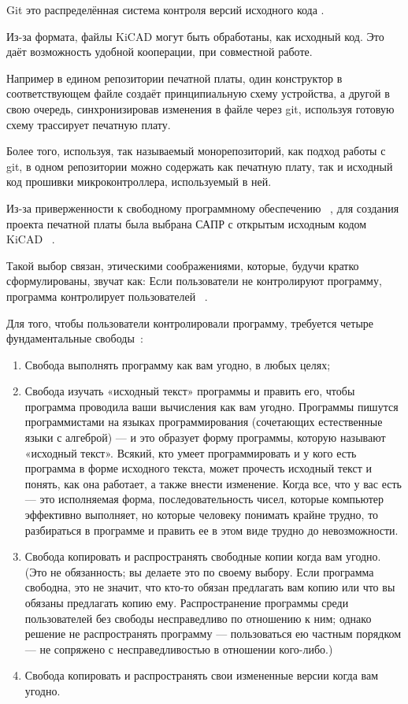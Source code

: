 Git это распределённая система контроля версий 
исходного кода \cite{git-dvcs}.

Из-за формата, файлы KiCAD могут быть обработаны, как
исходный код.
Это даёт возможность удобной кооперации, при совместной работе.

Например в едином репозитории печатной платы, один конструктор в
соответствующем файле создаёт принципиальную схему устройства, а
другой в свою очередь, синхронизировав изменения в файле через
git, используя готовую схему трассирует печатную плату.

Более того, используя, так называемый монорепозиторий, как подход
работы с git, в одном репозитории можно содержать как
печатную плату, так и исходный код прошивки микроконтроллера,
используемый в ней.

Из-за приверженности к свободному программному обеспечению
~\cite{GNU-philosophy}, для создания проекта печатной платы была
выбрана САПР с открытым исходным кодом KiCAD
~\cite{kicad-license}.

Такой выбор связан, этическими соображениями, которые, будучи
кратко сформулированы, звучат как:
Если пользователи не контролируют программу,
программа контролирует пользователей ~\cite{unfair-nonfree-programms}.

Для того, чтобы пользователи контролировали программу, требуется
четыре фундаментальные свободы~\cite{unfair-nonfree-programms}:

\begin{enumerate}
\item Свобода выполнять программу как вам угодно, в любых целях;
  
\item Свобода изучать «исходный текст» программы и править его, чтобы
программа проводила ваши вычисления как вам угодно. Программы пишутся
программистами на языках программирования (сочетающих естественные
языки с алгеброй) — и это образует форму программы, которую называют
«исходный текст». Всякий, кто умеет программировать и у кого есть
программа в форме исходного текста, может прочесть исходный текст и
понять, как она работает, а также внести изменение. Когда все, что у
вас есть — это исполняемая форма, последовательность чисел, которые
компьютер эффективно выполняет, но которые человеку понимать крайне
трудно, то разбираться в программе и править ее в этом виде трудно до
невозможности.

\item  Свобода копировать и распространять свободные копии когда вам
угодно. (Это не обязанность; вы делаете это по своему выбору. Если
программа свободна, это не значит, что кто-то обязан предлагать вам
копию или что вы обязаны предлагать копию ему. Распространение
программы среди пользователей без свободы несправедливо по отношению к
ним; однако решение не распространять программу — пользоваться ею
частным порядком — не сопряжено с несправедливостью в отношении
кого-либо.)

\item Свобода копировать и распространять свои измененные версии когда
вам угодно.
\end{enumerate}

